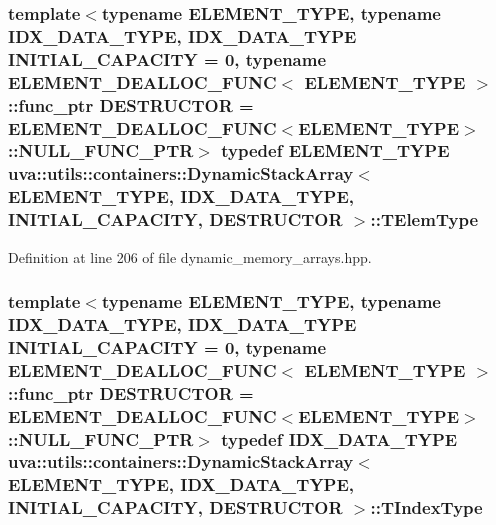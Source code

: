 \subsubsection[{T\+Elem\+Type}]{\setlength{\rightskip}{0pt plus 5cm}template$<$typename E\+L\+E\+M\+E\+N\+T\+\_\+\+T\+Y\+P\+E, typename I\+D\+X\+\_\+\+D\+A\+T\+A\+\_\+\+T\+Y\+P\+E, I\+D\+X\+\_\+\+D\+A\+T\+A\+\_\+\+T\+Y\+P\+E I\+N\+I\+T\+I\+A\+L\+\_\+\+C\+A\+P\+A\+C\+I\+T\+Y = 0, typename E\+L\+E\+M\+E\+N\+T\+\_\+\+D\+E\+A\+L\+L\+O\+C\+\_\+\+F\+U\+N\+C$<$ E\+L\+E\+M\+E\+N\+T\+\_\+\+T\+Y\+P\+E $>$\+::func\+\_\+ptr D\+E\+S\+T\+R\+U\+C\+T\+O\+R = E\+L\+E\+M\+E\+N\+T\+\_\+\+D\+E\+A\+L\+L\+O\+C\+\_\+\+F\+U\+N\+C$<$\+E\+L\+E\+M\+E\+N\+T\+\_\+\+T\+Y\+P\+E$>$\+::\+N\+U\+L\+L\+\_\+\+F\+U\+N\+C\+\_\+\+P\+T\+R$>$ typedef E\+L\+E\+M\+E\+N\+T\+\_\+\+T\+Y\+P\+E {\bf uva\+::utils\+::containers\+::\+Dynamic\+Stack\+Array}$<$ E\+L\+E\+M\+E\+N\+T\+\_\+\+T\+Y\+P\+E, I\+D\+X\+\_\+\+D\+A\+T\+A\+\_\+\+T\+Y\+P\+E, I\+N\+I\+T\+I\+A\+L\+\_\+\+C\+A\+P\+A\+C\+I\+T\+Y, D\+E\+S\+T\+R\+U\+C\+T\+O\+R $>$\+::{\bf T\+Elem\+Type}}\label{classuva_1_1utils_1_1containers_1_1_dynamic_stack_array_ac994c5aa3fa4d7fadf187a81f41a009d}


Definition at line 206 of file dynamic\+\_\+memory\+\_\+arrays.\+hpp.

\hypertarget{classuva_1_1utils_1_1containers_1_1_dynamic_stack_array_a2248ed51238b917fabf5cec6bec1f25c}{}
\subsubsection[{T\+Index\+Type}]{\setlength{\rightskip}{0pt plus 5cm}template$<$typename E\+L\+E\+M\+E\+N\+T\+\_\+\+T\+Y\+P\+E, typename I\+D\+X\+\_\+\+D\+A\+T\+A\+\_\+\+T\+Y\+P\+E, I\+D\+X\+\_\+\+D\+A\+T\+A\+\_\+\+T\+Y\+P\+E I\+N\+I\+T\+I\+A\+L\+\_\+\+C\+A\+P\+A\+C\+I\+T\+Y = 0, typename E\+L\+E\+M\+E\+N\+T\+\_\+\+D\+E\+A\+L\+L\+O\+C\+\_\+\+F\+U\+N\+C$<$ E\+L\+E\+M\+E\+N\+T\+\_\+\+T\+Y\+P\+E $>$\+::func\+\_\+ptr D\+E\+S\+T\+R\+U\+C\+T\+O\+R = E\+L\+E\+M\+E\+N\+T\+\_\+\+D\+E\+A\+L\+L\+O\+C\+\_\+\+F\+U\+N\+C$<$\+E\+L\+E\+M\+E\+N\+T\+\_\+\+T\+Y\+P\+E$>$\+::\+N\+U\+L\+L\+\_\+\+F\+U\+N\+C\+\_\+\+P\+T\+R$>$ typedef I\+D\+X\+\_\+\+D\+A\+T\+A\+\_\+\+T\+Y\+P\+E {\bf uva\+::utils\+::containers\+::\+Dynamic\+Stack\+Array}$<$ E\+L\+E\+M\+E\+N\+T\+\_\+\+T\+Y\+P\+E, I\+D\+X\+\_\+\+D\+A\+T\+A\+\_\+\+T\+Y\+P\+E, I\+N\+I\+T\+I\+A\+L\+\_\+\+C\+A\+P\+A\+C\+I\+T\+Y, D\+E\+S\+T\+R\+U\+C\+T\+O\+R $>$\+::{\bf T\+Index\+Type}}\label{classuva_1_1utils_1_1containers_1_1_dynamic_stack_array_a2248ed51238b917fabf5cec6bec1f25c}


